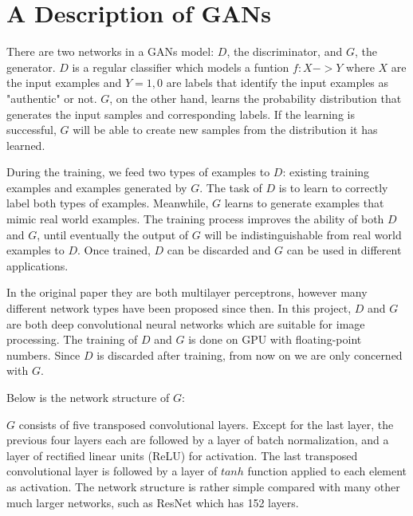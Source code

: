 
\chapter{A Description of GANs}

There are two networks in a GANs model: $D$, the discriminator, and $G$, the generator. $D$ is a regular
classifier which models a funtion $f: X -> Y$ where $X$ are the input examples and $Y = {1, 0}$ are labels
that identify the input examples as "authentic" or not. $G$, on the other hand, learns the probability
distribution that generates the input samples and corresponding labels. If the learning is successful,
$G$ will be able to create new samples from the distribution it has learned.

During the training, we feed two types of examples to $D$: existing training examples and examples generated
by $G$. The task of $D$ is to learn to correctly label both types of examples. Meanwhile, $G$ learns to
generate examples that mimic real world examples. The training process improves the ability of both $D$
and $G$, until eventually the output of $G$ will be indistinguishable from real world examples to $D$. Once
trained, $D$ can be discarded and $G$ can be used in different applications.

In the original paper they are both multilayer perceptrons, however many different network types have been
proposed since then. In this project, $D$ and $G$ are both deep convolutional neural networks which are
suitable for image processing. The training of $D$ and $G$ is done on GPU with floating-point numbers. Since
$D$ is discarded after training, from now on we are only concerned with $G$.

Below is the network structure of $G$:

$G$ consists of five transposed convolutional layers. Except for the last layer, the previous four layers
each are followed by a layer of batch normalization, and a layer of rectified linear units (ReLU) for
activation. The last transposed convolutional layer is followed by a layer of $tanh$ function applied to
each element as activation. The network structure is rather simple compared with many other much larger
networks, such as ResNet which has 152 layers.

\clearpage %
